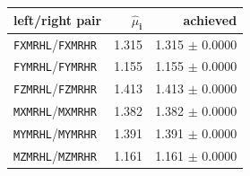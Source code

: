 \begin{tabular}{l r r}
left/right pair & $\hat\mu_\mathbf{i}$ & achieved \\
\hline
\texttt{FXMRHL}/\texttt{FXMRHR} & 1.315 & 1.315 $\pm$ 0.0000 \\
\texttt{FYMRHL}/\texttt{FYMRHR} & 1.155 & 1.155 $\pm$ 0.0000 \\
\texttt{FZMRHL}/\texttt{FZMRHR} & 1.413 & 1.413 $\pm$ 0.0000 \\
\texttt{MXMRHL}/\texttt{MXMRHR} & 1.382 & 1.382 $\pm$ 0.0000 \\
\texttt{MYMRHL}/\texttt{MYMRHR} & 1.391 & 1.391 $\pm$ 0.0000 \\
\texttt{MZMRHL}/\texttt{MZMRHR} & 1.161 & 1.161 $\pm$ 0.0000 \\
\end{tabular}
